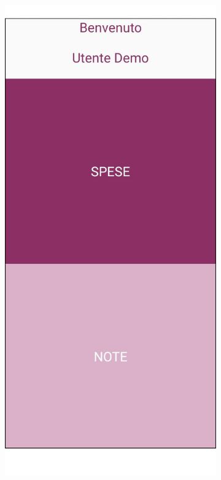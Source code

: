 \begin{figure}[H]
    \begin{subfigure}{.5\textwidth}
        \centering
        \includegraphics[width=.7\columnwidth]{images/screenshot/old/home.png}\vspace{2mm}
    \end{subfigure}
    \begin{subfigure}{.5\textwidth}
        \centering

\end{subfigure}
\end{figure}
